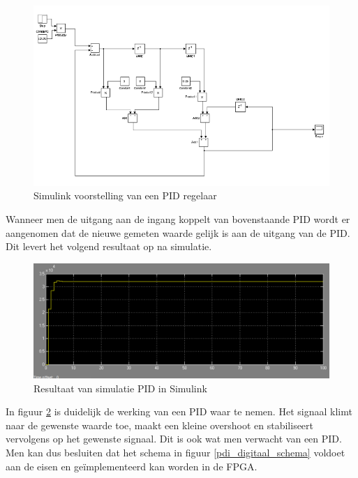 				\begin{figure}[H]					  
					  \centering
					  \includegraphics[width=\textwidth]{Vooronderzoek/pid_simulink_simulatie.png}
					  \caption{Simulink voorstelling van een PID regelaar}
					  \label{pdi_simulink_schema}
				\end{figure}

			\par Wanneer men de uitgang aan de ingang koppelt van bovenstaande PID wordt er aangenomen dat de nieuwe gemeten waarde gelijk is aan de uitgang van de PID. Dit levert het volgend resultaat op na simulatie.

				\begin{figure}[H]					  
					  \centering
					  \includegraphics[width=\textwidth]{Vooronderzoek/pid_simulink_resultaat.png}
					  \caption{Resultaat van simulatie PID in Simulink }
					  \label{pdi_simulink_resultaat}
				\end{figure}

			\par In figuur \ref{pdi_simulink_resultaat} is duidelijk de werking van een PID waar te nemen. Het signaal klimt naar de gewenste waarde toe, maakt een kleine overshoot en stabiliseert vervolgens op het gewenste signaal. Dit is ook wat men verwacht van een PID. Men kan dus besluiten dat het schema in figuur \ref{pdi_digitaal_schema} voldoet aan de eisen en ge\"implementeerd kan worden in de FPGA.

